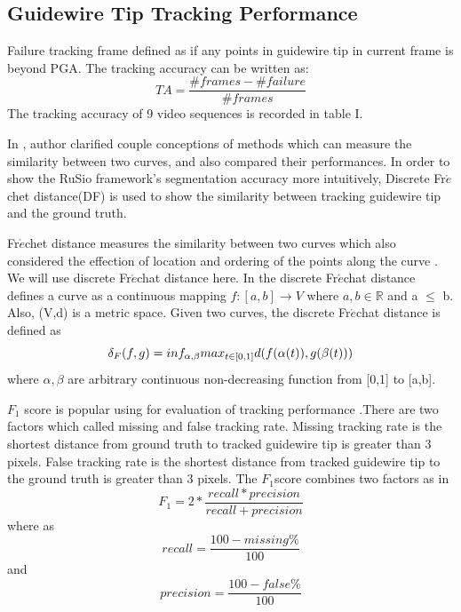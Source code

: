 \documentclass[journal]{IEEEtran}
\begin{document}
\subsection{Guidewire Tip Tracking Performance}
Failure tracking frame defined as if any points in guidewire tip in current frame is beyond PGA. The tracking accuracy can be written as: 
\begin{equation}
TA= \frac{\#frames - \#failure}{\#frames}
\end{equation} 
The tracking accuracy of 9 video sequences is recorded in table I. 

In \cite{Jekel2018Similarity}, author clarified couple conceptions of methods which can measure the similarity between two curves, and also compared their performances. In order to show the RuSio framework’s segmentation accuracy more intuitively, Discrete Fr$\acute{e}$chet distance(DF) is used to show the similarity between tracking guidewire tip and the ground truth.\par
Fr$\acute{e}$chet distance measures the similarity between two curves which also considered the effection of location and ordering of the points along the curve \cite{Eiter1994Computing}. We will use discrete Fr$\acute{e}$chat distance here. In\cite{Eiter1994Computing} the discrete Fr$\acute{e}$chat distance defines a curve as a continuous mapping $f:[a,b] \rightarrow V$ where $a,b  \in  \mathbb{R}$ and a $\leq$ b. Also, (V,d) is a metric space. Given two curves, the discrete Fr$\acute{e}$chat distance is defined as 
\begin{equation}
\delta_F(f,g) =  inf_{\alpha,\beta}max_{t \in [0,1] }d(f(\alpha(t)),g(\beta(t)))\\
\end{equation}
where $\alpha, \beta$ are arbitrary continuous non-decreasing function from [0,1] to [a,b].\par

$F_{1}$ score is popular using for evaluation of tracking performance \cite{vandini2017robust}\cite{Peng2009Robust}\cite{6671560} .There are two factors which called missing and false tracking rate.
Missing tracking rate is the shortest distance from ground truth to tracked guidewire tip is greater than 3 pixels. 
False tracking rate is the shortest distance from tracked guidewire tip to the ground truth is greater than 3 pixels.
The $F_{1}$score combines two factors as in \cite{vandini2017robust}\cite{6671560}
\begin{equation}
F_{1} = 2*\frac{recall*precision}{recall+precision}
\end{equation}
where as 
\begin{equation}
recall = \frac{100-missing\%}{100}
\end{equation}
and
\begin{equation}
precision = \frac{100-false\%}{100}
\end{equation}
\end{document}
